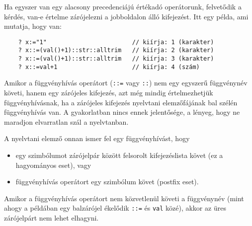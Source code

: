 Ha egyszer van egy alacsony precedenciájú értékadó operátorunk,
felvetődik a kérdés,  van-e értelme zárójelezni a jobboldalon álló kifejezést.
Itt egy példa, ami mutatja, hogy van:

\begin{verbatim}
    ? x:="1"                        // kiírja: 1 (karakter)
    ? x::=(val()+1)::str::alltrim   // kiírja: 2 (karakter)
    ? x::=(val()+1)::str::alltrim   // kiírja: 3 (karakter)
    ? x::=val+1                     // kiírja: 4 (szám)
\end{verbatim}

Amikor a függvényhívás operátort (\verb!::=! vagy \verb!::!) 
nem egy egyszerű függvénynév követi, hanem egy zárójeles kifejezés,
azt még mindig értelmezhetjük függvényhívásnak, ha a zárójeles kifejezés
nyelvtani elemzőfájának bal szélén függvényhívás van. A gyakorlatban
nincs ennek jelentősége, a lényeg, hogy ne maradjon elvarratlan szál 
a nyelvtanban.

A nyelvtani elemző onnan ismer fel egy függvényhívást, hogy
\begin{itemize}
 \item egy szimbólumot zárójelpár között felsorolt kifejezéslista követ 
        (ez a hagyományos eset), vagy
 \item
      függvényhívás operátort egy szimbólum követ (postfix eset).
\end{itemize}
Amikor a függvényhívás operátort nem közvetlenül követi a függvénynév
(mint ahogy a példában egy balzárójel ékelődik \verb!::=! és \verb!val! közé),
akkor az üres zárójelpárt nem lehet elhagyni.

